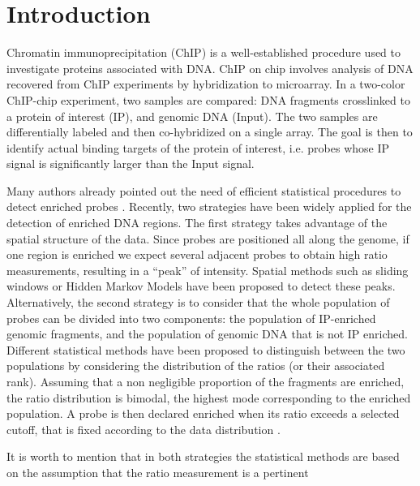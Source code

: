 \documentclass{llncs}
\begin{document}
\section{Introduction}
Chromatin immunoprecipitation (ChIP) is a well-established procedure
used to investigate proteins associated with DNA. ChIP on chip
involves analysis of DNA recovered from ChIP experiments by
hybridization to microarray. In a two-color ChIP-chip experiment,
two samples are compared: DNA fragments crosslinked to a protein of
interest (IP), and genomic DNA (Input). The two samples are
differentially labeled and then co-hybridized on a single array. The
goal is then to identify actual binding targets of the protein of
interest, i.e. probes whose IP signal is significantly larger
than the Input signal. {\par}
Many authors already pointed out the need of efficient statistical
procedures to detect enriched probes \cite{BuckLieb04,Keles07}.
Recently, two strategies have been widely applied for the detection of
enriched DNA regions. The first strategy takes advantage of the
spatial structure of the data. Since probes are positioned all along
the genome, if one region is enriched we expect several adjacent
probes to obtain high ratio measurements, resulting in a ``peak'' of
intensity. Spatial methods such as sliding windows
\cite{Cawley04,Keles07} or Hidden Markov Models
\cite{JiWong05,LiMeyerLiu05} have been proposed to detect these peaks.
Alternatively, the second strategy is to consider that the whole
population of probes can be divided into two components: the
population of IP-enriched genomic fragments, and the population of
genomic DNA that is not IP enriched. Different statistical methods
have been proposed to distinguish between the two populations by
considering the distribution of the ratios (or their associated rank).
Assuming that a non negligible proportion of the fragments are
enriched, the ratio distribution is bimodal, the highest mode
corresponding to the enriched population. A probe is then declared
enriched when its ratio exceeds a selected cutoff, that is fixed
according to the data distribution \cite{BuckLieb04}. {\par} It is
worth to mention that in both strategies the statistical methods are
based on the assumption that the ratio measurement is a pertinent
\end{document}
